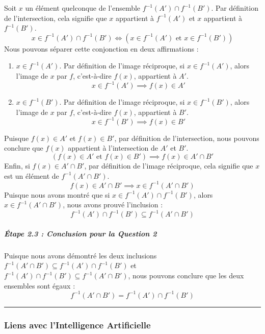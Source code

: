 \documentclass[12pt,a4paper]{report}
\begin{document}
Soit \(x\) un élément quelconque de l'ensemble
\(f^{-1}(A') \cap f^{-1}(B')\). Par définition de l'intersection, cela
signifie que \(x\) appartient à \(f^{-1}(A')\) et \(x\) appartient à
\(f^{-1}(B')\).
\[x \in f^{-1}(A') \cap f^{-1}(B') \iff (x \in f^{-1}(A') \text{ et } x \in f^{-1}(B'))\]
Nous pouvons séparer cette conjonction en deux affirmations :

\begin{enumerate}
\def\labelenumi{\arabic{enumi}.}
\item
  \(x \in f^{-1}(A')\). Par définition de l'image réciproque, si
  \(x \in f^{-1}(A')\), alors l'image de \(x\) par \(f\), c'est-à-dire
  \(f(x)\), appartient à \(A'\).
  \[x \in f^{-1}(A') \implies f(x) \in A'\]
\item
  \(x \in f^{-1}(B')\). Par définition de l'image réciproque, si
  \(x \in f^{-1}(B')\), alors l'image de \(x\) par \(f\), c'est-à-dire
  \(f(x)\), appartient à \(B'\).
  \[x \in f^{-1}(B') \implies f(x) \in B'\]
\end{enumerate}

Puisque \(f(x) \in A'\) et \(f(x) \in B'\), par définition de
l'intersection, nous pouvons conclure que \(f(x)\) appartient à
l'intersection de \(A'\) et \(B'\).
\[(f(x) \in A' \text{ et } f(x) \in B') \implies f(x) \in A' \cap B'\]
Enfin, si \(f(x) \in A' \cap B'\), par définition de l'image réciproque,
cela signifie que \(x\) est un élément de \(f^{-1}(A' \cap B')\).
\[f(x) \in A' \cap B' \implies x \in f^{-1}(A' \cap B')\] Puisque nous
avons montré que si \(x \in f^{-1}(A') \cap f^{-1}(B')\), alors
\(x \in f^{-1}(A' \cap B')\), nous avons prouvé l'inclusion :
\[f^{-1}(A') \cap f^{-1}(B') \subseteq f^{-1}(A' \cap B')\]

\subparagraph{Étape 2.3 : Conclusion pour la Question
2}\label{uxe9tape-2.3-conclusion-pour-la-question-2}

Puisque nous avons démontré les deux inclusions
\(f^{-1}(A' \cap B') \subseteq f^{-1}(A') \cap f^{-1}(B')\) et
\(f^{-1}(A') \cap f^{-1}(B') \subseteq f^{-1}(A' \cap B')\), nous
pouvons conclure que les deux ensembles sont égaux :
\[f^{-1}(A' \cap B') = f^{-1}(A') \cap f^{-1}(B')\]

\begin{center}\rule{0.5\linewidth}{0.5pt}\end{center}

\subsubsection{Liens avec l'Intelligence
Artificielle}\label{liens-avec-lintelligence-artificielle}
\end{document}
